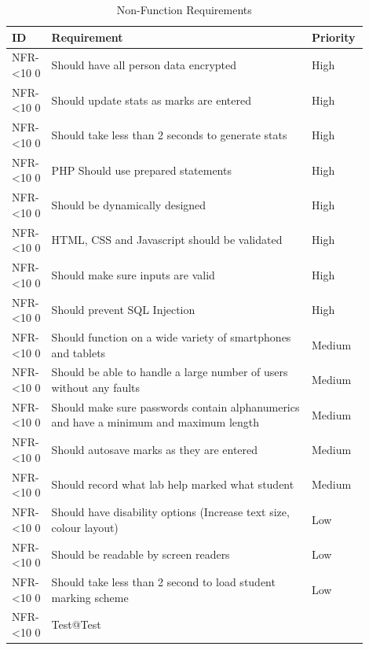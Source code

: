 \documentclass[12pt]{article}  %
\newcommand{\rid}[1]{\centering #1-\ifnum\value{requirement}<10 0\fi\arabic{requirement} \stepcounter{requirement}}
\begin{document}
\begin{spacing}{1.2}
\begin{longtable}{|p{0.1\linewidth}|p{0.7\linewidth}|p{0.1\linewidth}|}
\caption{Non-Function Requirements} \label{table:non-func}\\
\hline
\textbf{ID} & \textbf{Requirement} & \textbf{Priority}\\
\hline \hline

\rid{NFR} & Should have all person data encrypted & High\\ \hline
\rid{NFR} & Should update stats as marks are entered & High\\ \hline
\rid{NFR} & Should take less than 2 seconds to generate stats  & High\\ \hline
\rid{NFR} & PHP Should use prepared statements & High\\ \hline
\rid{NFR} & Should be dynamically designed & High\\ \hline
\rid{NFR} & HTML, CSS and Javascript should be validated & High\\ \hline
\rid{NFR} & Should make sure inputs are valid & High\\ \hline
\rid{NFR} & Should prevent SQL Injection & High\\ \hline

\rid{NFR} & Should function on a wide variety of smartphones and tablets & Medium\\ \hline
\rid{NFR} & Should be able to handle a large number of users without any faults & Medium\\ \hline
\rid{NFR} & Should make sure passwords contain alphanumerics and have a minimum and maximum length  & Medium\\ \hline
\rid{NFR} & Should autosave marks as they are entered & Medium\\ \hline
\rid{NFR} & Should record what lab help marked what student & Medium\\ \hline

\rid{NFR} & Should have disability options (Increase text size, colour layout) & Low\\ \hline
\rid{NFR} & Should be readable by screen readers & Low\\ \hline
\rid{NFR} & Should take less than 2 second to load student marking scheme & Low\\ \hline
\rid{NFR} & Test@Test\\ \hline


\end{longtable}
\end{spacing}
\end{document}
